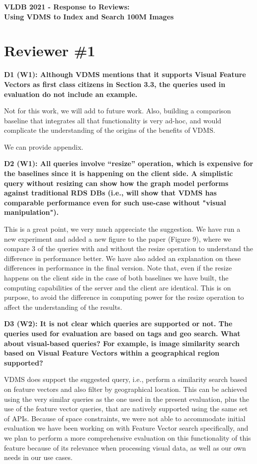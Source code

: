 \documentclass[11pt]{proposalnsf}
\begin{document}
\begin{center}
{\Large{\bf VLDB 2021 - Response to Reviews: \\
Using VDMS to Index and Search 100M Images}}

\end{center}

\section{Reviewer \#1}

\noindent %
\textbf{
D1 (W1): Although VDMS mentions that it supports Visual Feature Vectors as
first class citizens in Section 3.3, the queries used in evaluation
do not include an example.
}\bigskip


Not for this work, we will add to future work.
Also, building a comparison baseline that integrates all that functionality
is very ad-hoc, and would complicate the understanding of the origins
of the benefits of VDMS.

We can provide appendix.

\bigskip
\noindent %
\textbf{
D2 (W1): All queries involve “resize” operation, which is expensive for the
baselines since it is happening on the client side.
A simplistic query without resizing can show how the graph model performs
against traditional RDS DBs (i.e., will show that VDMS has comparable
performance even for such use-case without "visual manipulation").
}\bigskip

This is a great point, we very much appreciate the suggestion.
We have run a new experiment and added a new figure to the paper (Figure 9),
where we compare 3 of the queries with and without the resize operation
to understand the difference in performance better.
We have also added an explanation on these differences in performance
in the final version.
Note that, even if the resize happens on the client side in the case of both
baselines we have built, the computing capabilities of the server and the
client are identical. This is on purpose, to avoid the difference in
computing power for the resize operation to affect the understanding
of the results.


\bigskip
\noindent %
\textbf{
D3 (W2): It is not clear which queries are supported or not.
The queries used for evaluation are based on tags and geo search.
What about visual-based queries? For example, is image similarity search based
on Visual Feature Vectors within a geographical region supported?
}\bigskip

VDMS does support the suggested query, i.e., perform a similarity search based
on feature vectors and also filter by geographical location.
This can be achieved using the very similar queries as the one used in
the present evaluation, plus the use of the feature vector queries,
that are natively supported using the same set of APIs.
Because of space constraints, we were not able to accommodate initial evaluation
we have been working on with Feature Vector search specifically,
and we plan to perform a more comprehensive evaluation on this functionality
of this feature because of its relevance when processing visual data, as well
as our own needs in our use cases.
\end{document}

